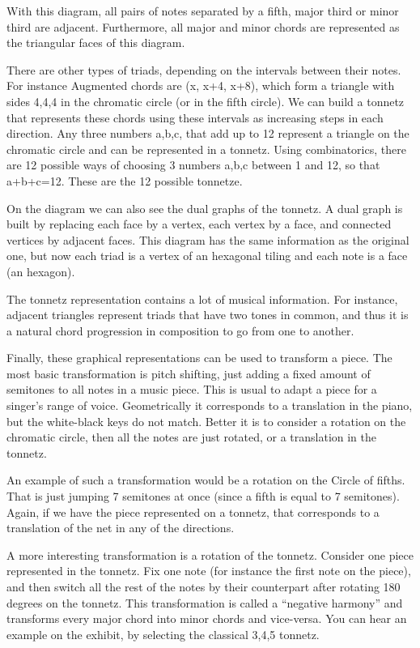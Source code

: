 With this diagram, all pairs of notes separated by a fifth, major third or minor third are adjacent. Furthermore, all major and minor chords are represented as the triangular faces of this diagram. 

There are other types of triads, depending on the intervals between their notes. For instance Augmented chords are (x, x+4, x+8), which form a triangle with sides 4,4,4 in the chromatic circle (or in the fifth circle). We can build a tonnetz that represents these chords using these intervals as increasing steps in each direction. Any three numbers a,b,c, that add up to 12 represent a triangle on the chromatic circle and can be represented in a tonnetz. Using combinatorics, there are 12 possible ways of choosing 3 numbers a,b,c between 1 and 12, so that a+b+c=12. These are the 12 possible tonnetze.

On the diagram we can also see the dual graphs of the tonnetz. A dual graph is built by replacing each face by a vertex, each vertex by a face, and connected vertices by adjacent faces. This diagram has the same information as the original one, but now each triad is a vertex of an hexagonal tiling and each note is a face (an hexagon).

The tonnetz representation contains a lot of musical information. For instance, adjacent triangles represent triads that have two tones in common, and thus it is a natural chord progression in composition to go from one to another.

Finally, these graphical representations can be used to transform a piece. The most basic transformation is pitch shifting, just adding a fixed amount of semitones to all notes in a music piece. This is usual to adapt a piece for a singer's range of voice. Geometrically it corresponds to a translation in the piano, but the white-black keys do not match. Better it is to consider a rotation on the chromatic circle, then all the notes are just rotated, or a translation in the tonnetz.

An example of such a transformation would be a rotation on the Circle of fifths. That is just jumping 7 semitones at once (since a fifth is equal to 7 semitones). Again, if we have the piece represented on a tonnetz, that corresponds to a translation of the net in any of the directions.

A more interesting transformation is a rotation of the tonnetz. Consider one piece represented in the tonnetz. Fix one note (for instance the first note on the piece), and then switch all the rest of the notes by their counterpart after rotating 180 degrees on the tonnetz. This transformation is called a ``negative harmony'' and transforms every major chord into minor chords and vice-versa. You can hear an example on the exhibit, by selecting the classical 3,4,5 tonnetz.

